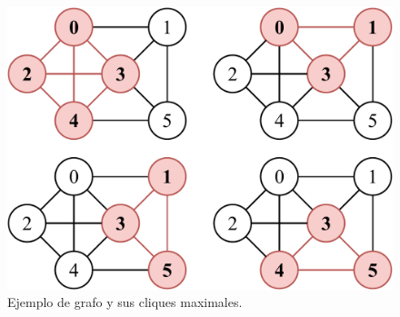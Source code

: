 \begin{figure}[t]
    	\centering
    	\includegraphics[width=.4\linewidth]{img/maxCliqueExample.pdf}
    	
    \caption{Ejemplo de grafo y sus cliques maximales.}
    \label{fig:maxCliqueExample}
\end{figure}
